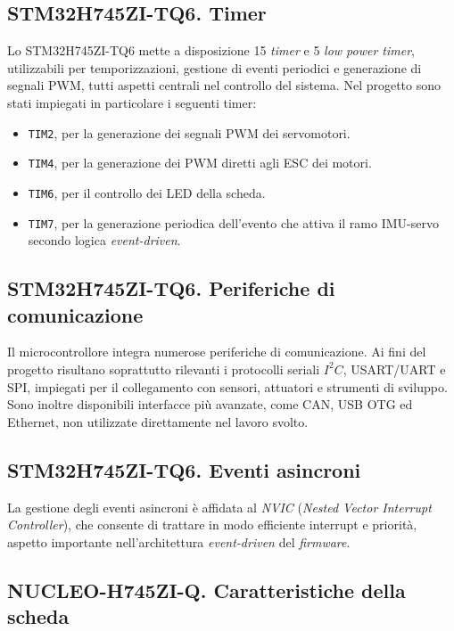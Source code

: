 \documentclass[11pt]{report}
\begin{document}
	\subsection{STM32H745ZI-TQ6. Timer}
	Lo STM32H745ZI-TQ6 mette a disposizione 15 \textit{timer} e 5 \textit{low power timer}, utilizzabili per temporizzazioni, gestione di eventi periodici e generazione di segnali PWM, tutti aspetti centrali nel controllo del sistema. Nel progetto sono stati impiegati in particolare i seguenti timer:
	\begin{itemize}
		\item \texttt{TIM2}, per la generazione dei segnali PWM dei servomotori.
		\item \texttt{TIM4}, per la generazione dei PWM diretti agli ESC dei motori.
		\item \texttt{TIM6}, per il controllo dei LED della scheda.
		\item \texttt{TIM7}, per la generazione periodica dell'evento che attiva il ramo IMU-servo secondo logica \textit{event-driven}.
		
	\end{itemize}
	
	\subsection{STM32H745ZI-TQ6. Periferiche di comunicazione}
	Il microcontrollore integra numerose periferiche di comunicazione. Ai fini del progetto risultano soprattutto rilevanti i protocolli seriali $I^{2}C$, USART/UART e SPI, impiegati per il collegamento con sensori, attuatori e strumenti di sviluppo. Sono inoltre disponibili interfacce più avanzate, come CAN, USB OTG ed Ethernet, non utilizzate direttamente nel lavoro svolto.
	
	\subsection{STM32H745ZI-TQ6. Eventi asincroni}
	La gestione degli eventi asincroni è affidata al \textit{NVIC} (\textit{Nested Vector Interrupt Controller}), che consente di trattare in modo efficiente interrupt e priorità, aspetto importante nell'architettura \textit{event-driven} del \textit{firmware}.
	
	
	\subsection{NUCLEO-H745ZI-Q. Caratteristiche della scheda}
	
\end{document}
